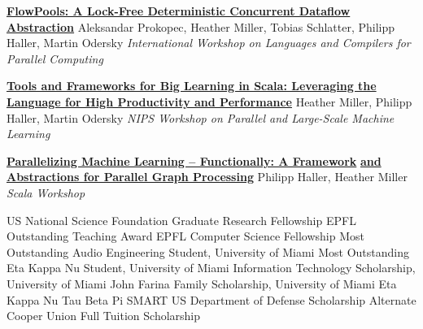 \documentclass[9pt]{article}
\begin{document}
\noindent\href{http://infoscience.epfl.ch/record/180265}{\bf FlowPools: A Lock-Free Deterministic Concurrent Dataflow Abstraction}
\newline\noindent Aleksandar Prokopec, Heather Miller, Tobias Schlatter, Philipp Haller, Martin Odersky
\newline\noindent\emph{International Workshop on Languages and Compilers for Parallel Computing}
\medskip

\noindent\href{http://infoscience.epfl.ch/record/170032}{\bf Tools and Frameworks for Big Learning in Scala: Leveraging the}\vspace{-0.03in}
\newline\noindent\href{http://infoscience.epfl.ch/record/170032}{\bf Language for High Productivity and Performance}
\newline\noindent Heather Miller, Philipp Haller, Martin Odersky
\newline\noindent\emph{NIPS Workshop on Parallel and Large-Scale Machine Learning}
\medskip

\noindent\href{http://infoscience.epfl.ch/record/165111}{\bf Parallelizing Machine Learning -- Functionally: A Framework}\vspace{-0.03in}
\newline\noindent\href{http://infoscience.epfl.ch/record/165111}{\bf and Abstractions for Parallel Graph Processing}
\newline\noindent Philipp Haller, Heather Miller
\newline\noindent\emph{Scala Workshop}
\bigskip

\medskip
{}

\noindent US National Science Foundation Graduate Research Fellowship 
\newline\noindent EPFL Outstanding Teaching Award 
\newline\noindent EPFL Computer Science Fellowship 
\newline\noindent Most Outstanding Audio Engineering Student, University of Miami 
\newline\noindent Most Outstanding Eta Kappa Nu Student, University of Miami 
\newline\noindent Information Technology Scholarship, University of Miami 
\newline\noindent John Farina Family Scholarship, University of Miami 
\newline\noindent Eta Kappa Nu 
\newline\noindent Tau Beta Pi 
\newline\noindent SMART US Department of Defense Scholarship Alternate 
\newline\noindent Cooper Union Full Tuition Scholarship 
\end{document}
